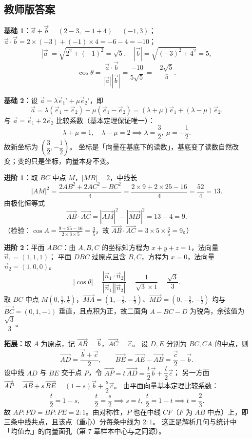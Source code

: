\begin{afterclass}
\subsection*{教师版答案}
\begin{solution}
\textbf{基础 1：}$\vec a+\vec b=(2-3,\,-1+4)=(-1,3)$；
$\vec a\cdot\vec b=2\times(-3)+(-1)\times4=-6-4=-10$；
\[
  |\vec a|=\sqrt{2^2+(-1)^2}=\sqrt5,\quad |\vec b|=\sqrt{(-3)^2+4^2}=5,
\]
\[
  \cos\theta=\frac{\vec a\cdot\vec b}{|\vec a||\vec b|}=\frac{-10}{5\sqrt5}=-\frac{2\sqrt5}{5}.
\]
\end{solution}
\begin{solution}
\textbf{基础 2：}设 $\vec a=\lambda\vec e_1'+\mu\vec e_2'$，即
\[
  \vec a=\lambda(\vec e_1+\vec e_2)+\mu(\vec e_1-\vec e_2)
  =(\lambda+\mu)\vec e_1+(\lambda-\mu)\vec e_2.
\]
与 $\vec a=\vec e_1+2\vec e_2$ 比较系数（基本定理保证唯一）：
\[
  \lambda+\mu=1,\quad \lambda-\mu=2\implies\lambda=\frac32,\ \mu=-\frac12.
\]
故新坐标为 $\left(\dfrac32,-\dfrac12\right)$。
坐标是「向量在基底下的读数」，基底变了读数自然改变；变的只是坐标，向量本身不变。
\end{solution}
\begin{solution}
\textbf{进阶 1：}取 $BC$ 中点 $M$，$|MB|=2$，中线长
\[
  |AM|^2=\frac{2AB^2+2AC^2-BC^2}{4}
  =\frac{2\times9+2\times25-16}{4}=\frac{52}{4}=13.
\]
由极化恒等式
\[
  \overrightarrow{AB}\cdot\overrightarrow{AC}=|\overrightarrow{AM}|^2-|\overrightarrow{MB}|^2=13-4=9.
\]
（检验：$\cos A=\frac{9+25-16}{2\times3\times5}=\frac{3}{5}$，故 $\overrightarrow{AB}\cdot\overrightarrow{AC}=3\times5\times\frac35=9$。）
\end{solution}
\begin{solution}
\textbf{进阶 2：}平面 $ABC$：由 $A,B,C$ 的坐标知方程为 $x+y+z=1$，法向量 $\vec n_1=(1,1,1)$；
平面 $DBC$ 过原点且含 $B,C$，方程为 $x=0$，法向量 $\vec n_2=(1,0,0)$。
\[
  |\cos\theta|=\frac{|\vec n_1\cdot\vec n_2|}{|\vec n_1||\vec n_2|}
  =\frac{1}{\sqrt3\times1}=\frac{\sqrt3}{3}.
\]
取 $BC$ 中点 $M(0,\tfrac12,\tfrac12)$，$\overrightarrow{MA}=(1,-\tfrac12,-\tfrac12)$、$\overrightarrow{MD}=(0,-\tfrac12,-\tfrac12)$ 均与 $\overrightarrow{BC}=(0,1,-1)$ 垂直，且点积为正，故二面角 $A-BC-D$ 为锐角，余弦值为 $\dfrac{\sqrt3}{3}$。
\end{solution}
\begin{solution}
\textbf{拓展：}取 $A$ 为原点，记 $\overrightarrow{AB}=\vec b$，$\overrightarrow{AC}=\vec c$。
设 $D,E$ 分别为 $BC,CA$ 的中点，则
\[
  \overrightarrow{AD}=\frac{\vec b+\vec c}{2},\qquad
  \overrightarrow{BE}=\overrightarrow{AE}-\overrightarrow{AB}=\frac{\vec c}{2}-\vec b.
\]
设中线 $AD$ 与 $BE$ 交于点 $P$，令 $\overrightarrow{AP}=t\,\overrightarrow{AD}=\dfrac{t}{2}\vec b+\dfrac{t}{2}\vec c$；
另一方面 $\overrightarrow{AP}=\overrightarrow{AB}+s\,\overrightarrow{BE}=(1-s)\vec b+\dfrac{s}{2}\vec c$。
由平面向量基本定理比较系数：
\[
  \frac t2=1-s,\qquad \frac t2=\frac s2
  \implies s=t,\ \frac t2=1-t\implies t=\frac23.
\]
故 $AP:PD=BP:PE=2:1$。由对称性，$P$ 也在中线 $CF$（$F$ 为 $AB$ 中点）上，即三条中线共点，且该点（重心）分每条中线为 $2:1$。
这正是解析几何与统计中「均值点」的向量面孔（第 7 章样本中心与之同源）。
\end{solution}
\end{afterclass}
